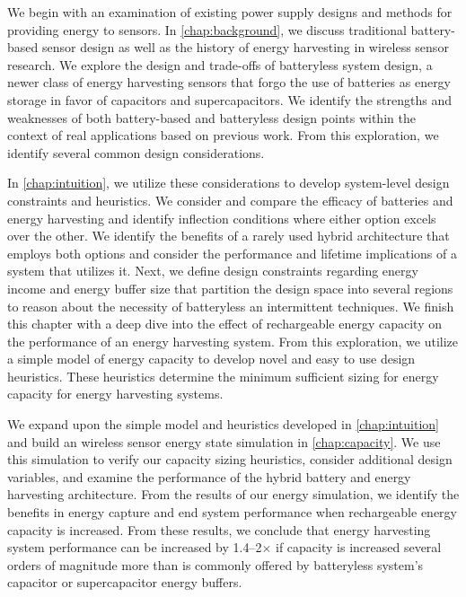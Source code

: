 We begin with an examination of existing power supply designs and methods for providing energy to sensors. In \cref{chap:background}, we discuss traditional battery-based sensor design as well as the history of energy harvesting in wireless sensor research.
We explore the design and trade-offs of batteryless system design, a newer class of energy harvesting sensors that forgo the use of batteries as energy storage in favor of capacitors and supercapacitors.
We identify the strengths and weaknesses of both battery-based and batteryless design points within the context of real applications based on previous work.
From this exploration, we identify several common design considerations.

In \cref{chap:intuition}, we utilize these considerations to develop system-level design constraints and heuristics.
We consider and compare the efficacy of batteries and energy harvesting and identify inflection conditions where either option excels over the other. We identify the benefits of a rarely used hybrid architecture that employs both options and consider the performance and lifetime implications of a system that utilizes it.
Next, we define design constraints regarding energy income and energy buffer size that partition the design space into several regions to reason about the necessity of batteryless an intermittent techniques. 
We finish this chapter with a deep dive into the effect of rechargeable energy capacity on the performance of an energy harvesting system. From this exploration, we utilize a simple model of energy capacity to develop novel and easy to use design heuristics. These heuristics determine the minimum sufficient sizing for energy capacity for energy harvesting systems. 

We expand upon the simple model and heuristics developed in \cref{chap:intuition} and build an wireless sensor energy state simulation in \cref{chap:capacity}.
We use this simulation to verify our capacity sizing heuristics, consider additional design variables, and examine the performance of the hybrid battery and energy harvesting architecture.
From the results of our energy simulation, we identify the benefits in energy capture and end system performance when rechargeable energy capacity is increased. From these results, we conclude that energy harvesting system performance can be increased by 1.4--2$\times$ if capacity is increased several orders of magnitude more than is commonly offered by batteryless system's capacitor or supercapacitor energy buffers. 


